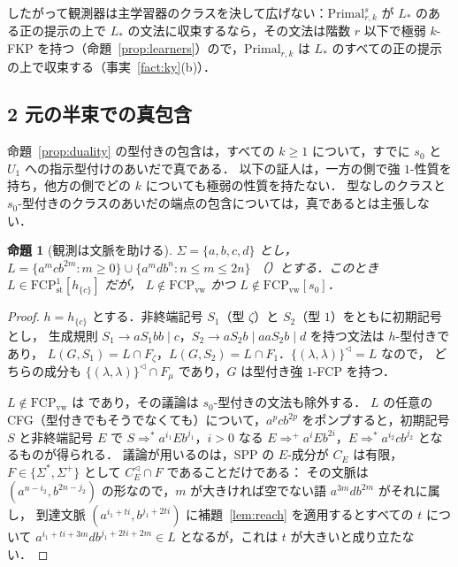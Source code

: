 \documentclass[11pt,a4paper]{ltjsarticle}
\numberwithin{equation}{section}
\theoremstyle{plain}
\newtheorem{proposition}[theorem]{命題}
\theoremstyle{definition}
\theoremstyle{remark}
\theoremstyle{plain}
\newcommand{\eps}{\lambda}
\newcommand{\Lc}{^{\lhd}}
\newcommand{\FCP}[2]{\mathrm{FCP}^{#1}_{\mathrm{#2}}}
\newcommand{\tFCP}[3]{\mathrm{FCP}^{#1}_{\mathrm{#2}}[#3]}
\begin{document}
したがって観測器は主学習器のクラスを決して広げない：$\mathrm{Primal}^s_{r,k}$ が $L_*$ のある正の提示の上で $L_*$ の文法に収束するなら，その文法は階数 $r$ 以下で極弱 $k$-FKP を持つ（命題~\ref{prop:learners}）ので，$\mathrm{Primal}_{r,k}$ は $L_*$ のすべての正の提示の上で収束する（事実~\ref{fact:ky}(b)）．

\subsection*{2 元の半束での真包含}

命題~\ref{prop:duality} の型付きの包含は，すべての $k\ge1$ について，すでに $s_0$ と $U_1$ への指示型付けのあいだで真である．
以下の証人は，一方の側で強 $1$-性質を持ち，他方の側でどの $k$ についても極弱の性質を持たない．
型なしのクラスと $s_0$-型付きのクラスのあいだの端点の包含については，真であるとは主張しない．

\begin{proposition}[観測は文脈を助ける]\label{prop:strict-context}
$\Sigma=\{a,b,c,d\}$ とし，
$L=\{a^mcb^{2m}:m\ge0\}\cup\{a^mdb^n:n\le m\le2n\}$
（\citealp[Prop.~2(i)]{ky2017}）とする．このとき $L\in\tFCP1{st}{h_{\{c\}}}$ だが，
$L\notin\FCP{}{vw}$ かつ $L\notin\tFCP{}{vw}{s_0}$．
\end{proposition}
\begin{proof}
$h=h_{\{c\}}$ とする．非終端記号 $S_1$（型 $\zeta$）と $S_2$（型 $1$）をともに初期記号とし，
生成規則 $S_1\to aS_1bb\mid c$，$S_2\to aS_2b\mid aaS_2b\mid d$ を持つ文法は $h$-型付きであり，
$L(G,S_1)=L\cap F_\zeta$，$L(G,S_2)=L\cap F_1$．$\{(\eps,\eps)\}\Lc=L$ なので，
どちらの成分も $\{(\eps,\eps)\}\Lc\cap F_\mu$ であり，$G$ は型付き強 $1$-FCP を持つ．

$L\notin\FCP{}{vw}$ は \citet[Prop.~2(i)]{ky2017} であり，その議論は $s_0$-型付きの文法も除外する．
$L$ の任意の CFG（型付きでもそうでなくても）について，$a^pcb^{2p}$ をポンプすると，初期記号 $S$ と非終端記号 $E$ で
$S\Rightarrow^*a^{i_1}Eb^{j_1}$，$i>0$ なる $E\Rightarrow^+a^iEb^{2i}$，$E\Rightarrow^*a^{i_2}cb^{j_2}$ となるものが得られる．
議論が用いるのは，SPP の $E$-成分が $C_E$ は有限，$F\in\{\Sigma^*,\Sigma^+\}$ として $C_E\Lc\cap F$ であることだけである：
その文脈は $(a^{n-i_2},b^{2n-j_2})$ の形なので，$m$ が大きければ空でない語 $a^{3m}db^{2m}$ がそれに属し，
到達文脈 $(a^{i_1+ti},b^{j_1+2ti})$ に補題~\ref{lem:reach} を適用するとすべての $t$ について $a^{i_1+ti+3m}db^{j_1+2ti+2m}\in L$ となるが，これは $t$ が大きいと成り立たない．
\end{proof}
\end{document}
